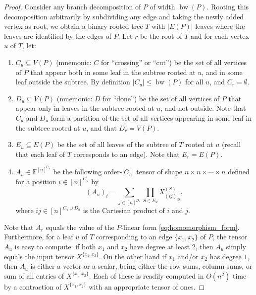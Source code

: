 \documentclass[11pt]{article}
\numberwithin{equation}{section}
\theoremstyle{definition}
\theoremstyle{plain}
\DeclareMathOperator{\bw}{bw}
\newcommand{\F}{\ensuremath{\mathbb{F}}}
\begin{document}
\begin{proof}
  Consider any branch decomposition of $P$ of
  width $\bw(P)$.  Rooting this decomposition arbitrarily by subdividing
  any edge and taking the newly added vertex as root, we obtain a
  binary rooted tree $T$ with $|E(P)|$ leaves where the leaves are
  identified by the edges of $P$.  Let $r$ be the root of $T$ and
  for each vertex $u$ of $T$, let:
  \begin{enumerate}
  \item $C_u \subseteq V(P)$ (mnemonic: $C$ for ``crossing'' or ``cut'') be the set of
    all vertices of $P$ that appear both in some leaf in the subtree
    rooted at $u$, and in some leaf outside the subtree.  By
    definition $|C_u| \le \bw(P)$ for all $u$, and $C_r = \emptyset$.

  \item $D_u \subseteq V(P)$ (mnemonic: $D$ for ``done'') be the set of all vertices of $P$ that
    appear only in leaves in the subtree rooted at $u$, and not
    outside.  Note that $C_u$ and $D_u$ form a partition of the set of
    all vertices appearing in some leaf in the subtree rooted at $u$,
    and that $D_r = V(P)$.

  \item $E_u \subseteq E(P)$ be the set of all leaves of the subtree
    of $T$ rooted at $u$ (recall that each leaf of $T$ corresponds to
    an edge).  Note that $E_r = E(P)$.

  \item $A_u \in \F^{[n]^{C_u}}$ be the following %
%
order-$|C_u|$
%
   tensor
    of shape $n \times n \times \cdots \times n$ defined for a position $i \in [n]^{C_u}$ by
    \[
    (A_u)_i = \sum_{j \in [n]^{D_u}} \prod_{S \in E_u} X^{(S)}_{(ij)_{|S}},
    \]
    where $ij \in [n]^{C_u \cup D_u}$ is the Cartesian product of $i$
    and $j$.
  \end{enumerate}

  Note that $A_r$ equals the value of the $P$-linear
  form \eqref{eq:homomorphism_form}.
  Furthermore, for a leaf $u$ of $T$ corresponding to an edge $\{x_1, x_2\}$ of
  $P$,
  the tensor  %
  $A_u$ is easy to compute: if %
  both $x_1$ and $x_2$  %
  have degree
  at least $2$, then $A_u$ simply equals the input tensor
  $X^{\{x_1,x_2\}}$.  On the other hand if $x_1$ and/or $x_2$ has
  degree $1$, then $A_u$ is either a vector or a scalar, being either
  the row sums, column sums, or sum of all entries of
  $X^{\{x_1,x_2\}}$.  Each of these is readily computed in $O(n^2)$
  time by a contraction of $X^{\{x_1,x_2\}}$ with an appropriate
  tensor of ones.


\end{proof}
\end{document}
